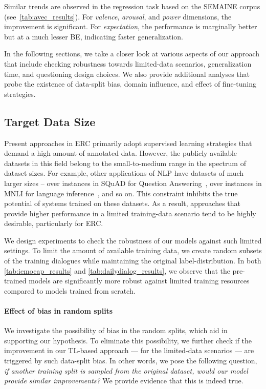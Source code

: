 \documentclass[preprint,3pt]{elsarticle}
\begin{document}
Similar trends are observed in the regression task based on the SEMAINE corpus (see~\cref{tab:avec_results}). For \textit{valence}, \textit{arousal}, and \textit{power} dimensions, the improvement is significant. For \textit{expectation}, the performance is marginally better but at a much lesser BE, indicating faster generalization.

In the following sections, we take a closer look at various aspects of our approach that include checking robustness towards limited-data scenarios, generalization time, and questioning design choices. We also provide additional analyses that probe the existence of data-split bias, domain influence, and effect of fine-tuning strategies.


\subsection{Target Data Size}

Present approaches in ERC primarily adopt supervised learning strategies that demand a high amount of annotated data. However, the publicly available datasets in this field belong to the small-to-medium range in the spectrum of dataset sizes. For example, other applications of NLP have datasets of much larger sizes -- over  instances in SQuAD for Question Answering~\cite{DBLP:conf/acl/RajpurkarJL18}, over  instances in MNLI for language inference~\cite{N18-1101}, and so on. This constraint inhibits the true potential of systems trained on these datasets. As a result, approaches that provide higher performance in a limited training-data scenario tend to be highly desirable, particularly for ERC.

We design experiments to check the robustness of our models against such limited settings. To limit the amount of available training data, we create random subsets of the training dialogues while maintaining the original label-distribution. In both \cref{tab:iemocap_results} and \ref{tab:dailydialog_results}, we observe that the pre-trained models are significantly more robust against limited training resources compared to models trained from scratch.

\paragraph{Effect of bias in random splits}

We investigate the possibility of bias in the random splits, which aid in supporting our hypothesis. To eliminate this possibility, we further check if the improvement in our TL-based approach --- for the limited-data scenarios --- are triggered by such data-split bias. In other words, we pose the following question, \textit{if another training split is sampled from the original dataset, would our model provide similar improvements?} We provide evidence that this is indeed true.
\end{document}

